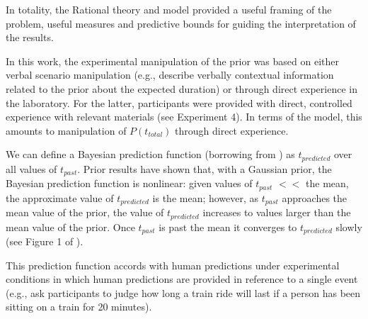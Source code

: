 In totality, the Rational theory and model provided a useful framing of the problem, useful measures and predictive bounds for guiding the interpretation of the results. 


In this work, the experimental manipulation of the prior was based on either verbal scenario manipulation (e.g., describe verbally contextual information related to the prior about the expected duration) or through direct experience in the laboratory. For the latter, participants were provided with direct, controlled experience with relevant materials (see \cite{GriffithsTenenbaum2011} Experiment 4).  In terms of the model, this amounts to manipulation of $P(t_{total})$ through direct experience. 

We can define a Bayesian prediction function (borrowing from \cite{GriffithsTenenbaum2006}) as $t_{predicted}$ over all values of $t_{past}$.  Prior results have shown that, with a Gaussian prior, the Bayesian prediction function is nonlinear: given values of $t_{past}$  $<<$ the mean, the approximate value of $t_{predicted}$ is the mean; however, as $t_{past}$ approaches the mean value of the prior, the value of $t_{predicted}$ increases to values larger than the mean value of the prior.  Once $t_{past}$ is past the mean it converges to $t_{predicted}$ slowly (see Figure 1 of \cite{GriffithsTenenbaum2006}).  

This prediction function accords with human predictions under experimental conditions \citep{GriffithsTenenbaum2006} in which human predictions are provided in reference to a single event (e.g., ask participants to judge how long a train ride will last if a person has been sitting on a train for 20 minutes).






